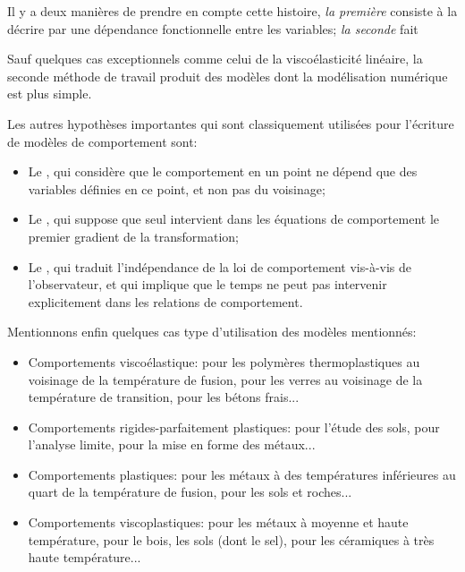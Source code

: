 Il y a deux manières de prendre en compte cette histoire, \emph{la première} consiste à la décrire par une 
dépendance fonctionnelle entre les variables; \emph{la seconde} fait  

Sauf quelques cas exceptionnels comme celui de la viscoélasticité linéaire, la seconde méthode de 
travail produit des modèles dont la modélisation numérique est plus simple. 

\medskip
Les autres hypothèses importantes qui sont classiquement utilisées pour l'écriture de modèles de 
comportement sont:
\begin{itemize}
   \item Le , qui considère que le comportement en un point ne dépend 
	que des variables définies en ce point, et non pas du voisinage;
   \item Le , qui suppose que seul intervient dans les équations 
	de comportement le premier gradient de la transformation;
   \item Le , qui traduit l'indépendance de la loi de comportement vis-à-vis 
	de l'observateur, et qui implique que le temps ne peut pas intervenir explicitement dans les relations de 
	comportement.
\end{itemize}

\medskip
Mentionnons enfin quelques cas type d'utilisation des modèles mentionnés:
\begin{itemize}
   \item Comportements viscoélastique: pour les polymères thermoplastiques au voisinage de la température 
	de fusion, pour les verres au voisinage de la température de transition, pour les bétons frais...
   \item Comportements rigides-parfaitement plastiques: pour l'étude des sols, pour l'analyse limite, 
	pour la mise en forme des métaux...
   \item Comportements plastiques: pour les métaux à des températures inférieures au quart de la 
	température de fusion, pour les sols et roches...
   \item Comportements viscoplastiques: pour les métaux à moyenne et haute température,
	pour le bois, les sols (dont le sel), pour les céramiques à très haute température...
\end{itemize}


